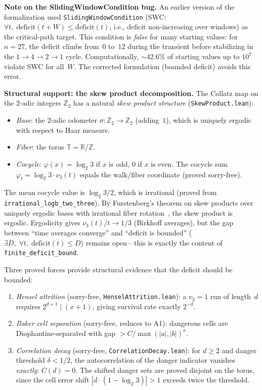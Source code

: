 \documentclass[manuscript]{aomart}
\newcommand{\Z}{\mathbb{Z}}
\newcommand{\R}{\mathbb{R}}
\theoremstyle{plain}
\theoremstyle{definition}
\theoremstyle{remark}
\numberwithin{equation}{section}
\begin{document}
\medskip\noindent\textbf{Note on the SlidingWindowCondition bug.}
An earlier version of the formalization used
\texttt{SlidingWindowCondition} (SWC: $\forall t,\;
\mathrm{deficit}(t + W) \le \mathrm{deficit}(t)$, i.e.,
deficit non-increasing over windows) as the critical-path target.
This condition is \emph{false} for many starting values: for $n = 27$,
the deficit climbs from~$0$ to~$12$ during the transient before
stabilizing in the $1 \to 4 \to 2 \to 1$ cycle.  Computationally,
${\sim}42.6\%$ of starting values up to $10^7$ violate SWC for all~$W$.
The corrected formulation (bounded deficit) avoids this error.

\medskip\noindent\textbf{Structural support: the skew product
decomposition.}
The Collatz map on the $2$-adic integers $\Z_2$ has a natural
\emph{skew product structure} (\texttt{SkewProduct.lean}):
\begin{itemize}
\item \emph{Base}: the $2$-adic odometer $\sigma \colon \Z_2 \to \Z_2$
  (adding~$1$), which is uniquely ergodic with respect to Haar measure.
\item \emph{Fiber}: the torus $\mathbb{T} = \R / \Z$.
\item \emph{Cocycle}: $\varphi(x) = \log_2 3$ if $x$ is odd, $0$ if
  $x$ is even.  The cocycle sum $\varphi_t = \log_2 3 \cdot \nu_3(t)$
  equals the walk/fiber coordinate (proved sorry-free).
\end{itemize}
The mean cocycle value is $\log_2 3 / 2$, which is irrational (proved
from \texttt{irrational\_logb\_two\_three}).  By Furstenberg's theorem
on skew products over uniquely ergodic bases with irrational fiber
rotation~\cite{Furstenberg1961}, the skew product is ergodic.
Ergodicity gives $\nu_3(t) / t \to 1/3$ (Birkhoff averages), but the
gap between ``time averages converge'' and ``deficit is bounded''
($\exists D,\; \forall t,\; \mathrm{deficit}(t) \le D$) remains
open---this is exactly the content of \texttt{finite\_deficit\_bound}.

Three proved forces provide structural evidence that the deficit
should be bounded:
\begin{enumerate}
\item \emph{Hensel attrition} (sorry-free, \texttt{HenselAttrition.lean}):
  a $v_2 = 1$ run of length~$d$ requires
  $2^{d+1} \mid (x + 1)$, giving survival rate exactly $2^{-d}$.
\item \emph{Baker cell separation} (sorry-free, reduces to A1):
  dangerous cells are Diophantine-separated with gap
  $> C / \max(|a|, |b|)^{\kappa}$.
\item \emph{Correlation decay} (sorry-free, \texttt{CorrelationDecay.lean}):
  for $d \ge 2$ and danger threshold $\delta < 1/2$, the autocorrelation
  of the danger indicator vanishes \emph{exactly}: $C(d) = 0$.  The
  shifted danger sets are proved disjoint on the torus, since the
  cell error shift $|d \cdot (1 - \log_2 3)| > 1$ exceeds twice the
  threshold.
\end{enumerate}
\end{document}
